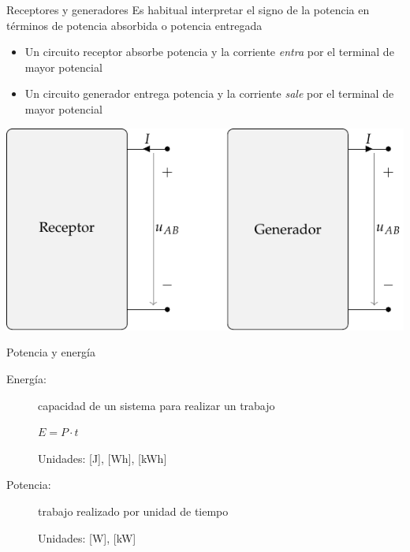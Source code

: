 \documentclass[aspectratio=169, xcolor={usenames,svgnames,dvipsnames}]{beamer}
\begin{document}

\begin{frame}{Receptores y generadores}
    \vspace{2mm}
    Es habitual \alert{interpretar} el signo de la potencia en términos de potencia absorbida o potencia entregada
    
    \vspace{1mm}
    \begin{itemize}
        \item Un \alert{circuito receptor absorbe potencia} y la corriente \emph{entra} por el terminal de mayor potencial

        \vspace{2mm}
        \item Un \alert{circuito generador entrega potencia} y la corriente \emph{sale} por el terminal de mayor potencial
    \end{itemize}

    \vspace{-4mm}
    \begin{center}
        \includegraphics[height=0.5\textheight]{../figs/receptor_generador.pdf}
    \end{center}
\end{frame}


\begin{frame}{Potencia y energía}
    \begin{description}    
        \item[{Energía}:] capacidad de un sistema para realizar un trabajo 
        
        \vspace{2mm}
        $E=P\cdot t$
        
        \vspace{2mm}
        Unidades: [J], [Wh], [kWh]
        
        
        \vspace{5mm}
        
        \item[{Potencia}:] trabajo realizado por unidad de tiempo

        \vspace{2mm}
        
        Unidades: [W], [kW]
    \end{description}
\end{frame}
\end{document}
